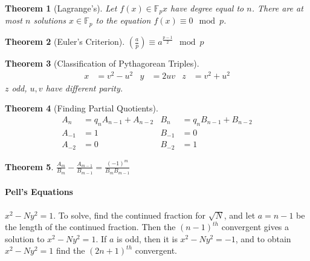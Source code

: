 \documentclass[10pt,letter]{article}
\theoremstyle{plain}
\newtheorem*{theorem*}{Theorem}
\theoremstyle{definition}
\begin{document}
\begin{theorem*}[Lagrange's]
     Let $f(x)\in\mathbb{F}_p{x}$ have degree equal to $n$. There are at most $n$ solutions $x\in\mathbb{F}_p$ to the equation $f(x)\equiv 0\mod{p}$.
\end{theorem*}
\begin{theorem*}[Euler's Criterion]
     $\left(\frac{a}{p}\right)\equiv a^{\frac{p-1}{2}}\mod{p}$
\end{theorem*}
\begin{theorem*}[Classification of Pythagorean Triples]
\begin{align*}x&=v^2-u^2 &y&=2uv &z&=v^2+u^2\end{align*} $z$ odd, $u,v$ have different parity. 
\end{theorem*}
\begin{theorem*}[Finding Partial Quotients]
\begin{align*}A_n&=q_nA_{n-1}+A_{n-2}&B_n&=q_nB_{n-1}+B_{n-2}\\A_{-1}&=1 &B_{-1}&=0\\A_{-2}&=0&B_{-2}&=1\end{align*}
\end{theorem*}
\begin{theorem*}
$\frac{A_m}{B_m}-\frac{A_{m-1}}{B_{m-1}}=\frac{(-1)^m}{B_mB_{m-1}}$
\end{theorem*}
\paragraph{Pell's Equations}
$x^2-Ny^2=1$. To solve, find the continued fraction for $\sqrt{N}$, and let $a=n-1$ be the length of the continued fraction. Then the $(n-1)^{th}$ convergent gives a solution to $x^2-Ny^2=1$. If $a$ is odd, then it is $x^2-Ny^2=-1$, and to obtain $x^2-Ny^2=1$ find the $(2n+1)^{th}$ convergent. 
\end{document}
